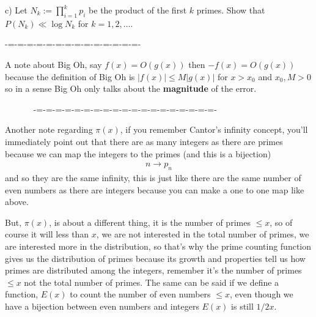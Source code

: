 \documentclass[aps,preprint,preprintnumbers,nofootinbib,showpacs,prd]{revtex4-1}
\newcommand{\nbea}{\begin{eqnarray*}}
\newcommand{\neea}{\end{eqnarray*}}
\begin{document}
c) Let $N_k := \prod_{i=1}^k p_i$ be the product of the ﬁrst $k$ primes. Show that $P(N_k) \ll \log N_k$ for $k = 1, 2, \dots$.







































-=-=-=-=-=-=-=-=-=-=-=-=-=-=-


A note about Big Oh, say $f(x) = O(g(x))$ then $-f(x) = O(g(x))$ because the definition of Big Oh is $|f(x)| \le M|g(x)|$ for $x > x_0$ and $x_0, M > 0$ so in a sense Big Oh only talks about the {\bf magnitude} of the error.




~~~~~~ -=-=-=-=-=-=-=-=-=-=-=-=-=-=-=-=-=-=-=-


Another note regarding $\pi(x)$, if you remember Cantor's infinity concept, you'll immediately point out that there are as many integers as there are primes because we can map the integers to the primes (and this is a bijection)
%
\nbea
n \to p_n
\neea
%
and so they are the same infinity, this is just like there are the same number of even numbers as there are integers because you can make a one to one map like above.

But, $\pi(x)$, is about a different thing, it is the number of primes $\le x$, so of course it will less than $x$, we are not interested in the total number of primes, we are interested more in the distribution, so that's why the prime counting function gives us the distribution of primes because its growth and properties tell us how primes are distributed among the integers, remember it's the number of primes $\le x$ not the total number of primes. The same can be said if we define a function, $E(x)$ to count the number of even numbers $\le x$, even though we have a bijection between even numbers and integers $E(x)$ is still $1/2 x$.
\end{document}
